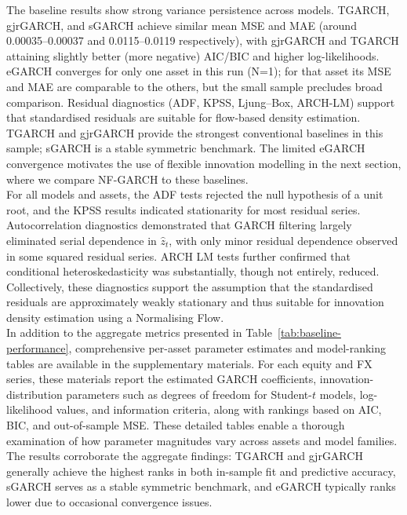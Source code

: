 \documentclass[oneside,12pt]{CUEDthesisPSnPDF}
\begin{document}
The baseline results show strong variance persistence across models. TGARCH, gjrGARCH, and sGARCH achieve similar mean MSE and MAE (around 0.00035--0.00037 and 0.0115--0.0119 respectively), with gjrGARCH and TGARCH attaining slightly better (more negative) AIC/BIC and higher log-likelihoods. eGARCH converges for only one asset in this run (N=1); for that asset its MSE and MAE are comparable to the others, but the small sample precludes broad comparison. Residual diagnostics (ADF, KPSS, Ljung--Box, ARCH-LM) support that standardised residuals are suitable for flow-based density estimation.\\

TGARCH and gjrGARCH provide the strongest conventional baselines in this sample; sGARCH is a stable symmetric benchmark. The limited eGARCH convergence motivates the use of flexible innovation modelling in the next section, where we compare NF-GARCH to these baselines.\\

For all models and assets, the ADF tests rejected the null hypothesis of a unit root, and the KPSS results indicated stationarity for most residual series. Autocorrelation diagnostics demonstrated that GARCH filtering largely eliminated serial dependence in $\hat{z}_t$, with only minor residual dependence observed in some squared residual series. ARCH LM tests further confirmed that conditional heteroskedasticity was substantially, though not entirely, reduced. Collectively, these diagnostics support the assumption that the standardised residuals are approximately weakly stationary and thus suitable for innovation density estimation using a Normalising Flow. \\

In addition to the aggregate metrics presented in Table~\ref{tab:baseline-performance}, comprehensive per-asset parameter estimates and model-ranking tables are available in the supplementary materials. For each equity and FX series, these materials report the estimated GARCH coefficients, innovation-distribution parameters such as degrees of freedom for Student-$t$ models, log-likelihood values, and information criteria, along with rankings based on AIC, BIC, and out-of-sample MSE. These detailed tables enable a thorough examination of how parameter magnitudes vary across assets and model families. The results corroborate the aggregate findings: TGARCH and gjrGARCH generally achieve the highest ranks in both in-sample fit and predictive accuracy, sGARCH serves as a stable symmetric benchmark, and eGARCH typically ranks lower due to occasional convergence issues.\\
\end{document}
